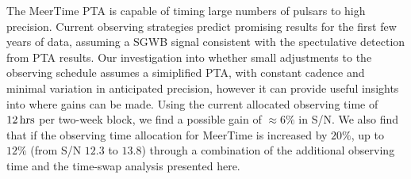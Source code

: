 
The MeerTime PTA is capable of timing large numbers of pulsars to high precision. 
Current observing strategies predict promising results for the first few years of data, assuming a SGWB signal consistent with the spectulative detection from PTA results. 
Our investigation into whether small adjustments to the observing schedule assumes a simiplified PTA, with constant cadence and minimal variation in anticipated precision, however it can provide useful insights into where gains can be made. 
Using the current allocated observing time of $12\,{\rm hrs}$ per two-week block, we find a possible gain of $\approx 6\%$ in S/N. 
We also find that if the observing time allocation for MeerTime is increased by $20\%$, up to $12\%$ (from S/N $12.3$ to $13.8$) through a combination of the additional observing time and the time-swap analysis presented here. 



